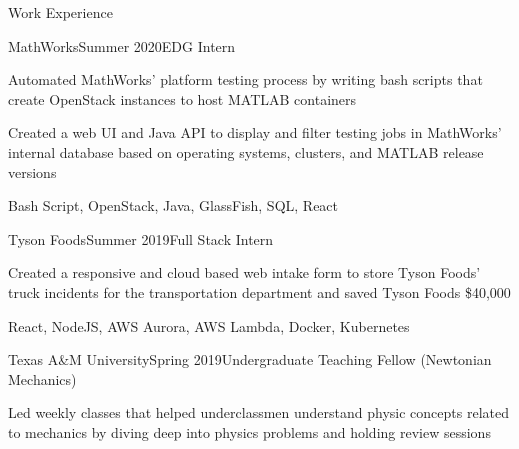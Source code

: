 \documentclass{resume} %
\begin{document}

\begin{rSection}{Work Experience}


    \begin{rSubsection}{MathWorks}{Summer 2020}{EDG Intern}{}
        \item Automated MathWorks' platform testing process by writing bash scripts that create OpenStack instances to host MATLAB containers
        \item Created a web UI and Java API to display and filter testing jobs in MathWorks' internal database based on operating systems, clusters, and MATLAB release versions
        \item Bash Script, OpenStack, Java, GlassFish, SQL, React
    \end{rSubsection}

    \begin{rSubsection}{Tyson Foods}{Summer 2019}{Full Stack Intern}{}
        \item Created a responsive and cloud based web intake form to store Tyson Foods’ truck incidents for the transportation department and saved Tyson Foods \$40,000
        \item React, NodeJS, AWS Aurora, AWS Lambda, Docker, Kubernetes
    \end{rSubsection}

    \begin{rSubsection}{Texas A\&M University}{Spring 2019}{Undergraduate Teaching Fellow (Newtonian Mechanics)}{}
        \item Led weekly classes that helped underclassmen understand physic concepts related to mechanics by diving deep into physics problems and holding review sessions
    \end{rSubsection}
\end{rSection}
\end{document}
